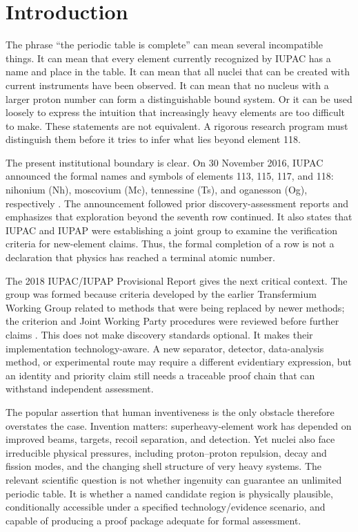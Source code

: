 \documentclass[conference]{IEEEtran}
\begin{document}
\section{Introduction}

The phrase ``the periodic table is complete'' can mean several incompatible things. It can mean that every element currently recognized by IUPAC has a name and place in the table. It can mean that all nuclei that can be created with current instruments have been observed. It can mean that no nucleus with a larger proton number can form a distinguishable bound system. Or it can be used loosely to express the intuition that increasingly heavy elements are too difficult to make. These statements are not equivalent. A rigorous research program must distinguish them before it tries to infer what lies beyond element 118.

The present institutional boundary is clear. On 30 November 2016, IUPAC announced the formal names and symbols of elements 113, 115, 117, and 118: nihonium (Nh), moscovium (Mc), tennessine (Ts), and oganesson (Og), respectively \cite{iupac2016}. The announcement followed prior discovery-assessment reports and emphasizes that exploration beyond the seventh row continued. It also states that IUPAC and IUPAP were establishing a joint group to examine the verification criteria for new-element claims. Thus, the formal completion of a row is not a declaration that physics has reached a terminal atomic number.

The 2018 IUPAC/IUPAP Provisional Report gives the next critical context. The group was formed because criteria developed by the earlier Transfermium Working Group related to methods that were being replaced by newer methods; the criterion and Joint Working Party procedures were reviewed before further claims \cite{iupac2018}. This does not make discovery standards optional. It makes their implementation technology-aware. A new separator, detector, data-analysis method, or experimental route may require a different evidentiary expression, but an identity and priority claim still needs a traceable proof chain that can withstand independent assessment.

The popular assertion that human inventiveness is the only obstacle therefore overstates the case. Invention matters: superheavy-element work has depended on improved beams, targets, recoil separation, and detection. Yet nuclei also face irreducible physical pressures, including proton--proton repulsion, decay and fission modes, and the changing shell structure of very heavy systems. The relevant scientific question is not whether ingenuity can guarantee an unlimited periodic table. It is whether a named candidate region is physically plausible, conditionally accessible under a specified technology/evidence scenario, and capable of producing a proof package adequate for formal assessment.
\end{document}
